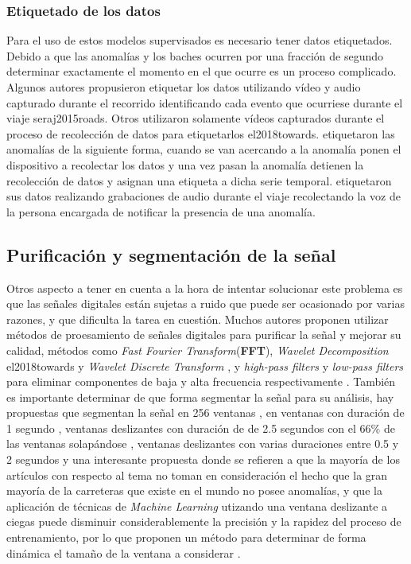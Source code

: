 		\subsubsection{Etiquetado de los datos}
			Para el uso de estos modelos supervisados es necesario tener datos etiquetados. Debido a que las anomalías y los baches ocurren por una 
			fracción de segundo determinar exactamente el momento en el que ocurre es un proceso complicado. Algunos autores propusieron etiquetar
			los datos utilizando vídeo y audio capturado durante el recorrido identificando cada evento que ocurriese durante el viaje \brackcite
			{seraj2015roads}. Otros utilizaron solamente vídeos capturados durante el proceso de recolección de datos para etiquetarlos \brackcite
			{el2018towards}.  etiquetaron las anomalías de la siguiente forma, cuando se van acercando a la anomalía
			ponen el dispositivo a recolectar los datos y una vez pasan la anomalía detienen la recolección de datos y asignan una etiqueta a dicha
			serie temporal.  etiquetaron sus datos realizando grabaciones de audio durante el viaje recolectando la voz 
			de la persona encargada de notificar la presencia de una anomalía.


	\subsection{Purificación y segmentación de la señal}
		Otros aspecto a tener en cuenta a la hora de intentar solucionar este problema es que las señales digitales están sujetas a ruido que puede ser
		ocasionado por varias razones, y que dificulta la tarea en cuestión. Muchos autores proponen utilizar métodos de proesamiento de señales digitales
		para purificar la señal y mejorar su calidad, métodos como \emph{Fast Fourier Transform}(\textbf{FFT}), \emph{Wavelet Decomposition} \brackcite
		{el2018towards} y \emph{Wavelet Discrete Transform} , y \emph{high-pass filters} y \emph{low-pass filters} para eliminar
		componentes de baja y alta frecuencia respectivamente . También es importante determinar de que
		forma segmentar la señal para su análisis, hay propuestas que segmentan la señal en 256 ventanas , en ventanas con
		duración de 1 segundo , ventanas deslizantes con duración de de 2.5 segundos con el 66\% de las ventanas solapándose
		, ventanas deslizantes con varias duraciones entre 0.5 y 2 segundos  y una interesante
		propuesta donde se refieren a que la mayoría de los artículos con respecto al tema no toman en consideración el hecho que la gran mayoría de la
		carreteras que existe en el mundo no posee anomalías, y que la aplicación de técnicas de \emph{Machine Learning} utizando una ventana deslizante
		a ciegas puede disminuir considerablemente la precisión y la rapidez del proceso de entrenamiento, por lo que proponen un método para determinar
		de forma dinámica el tamaño de la ventana a considerar .
		
